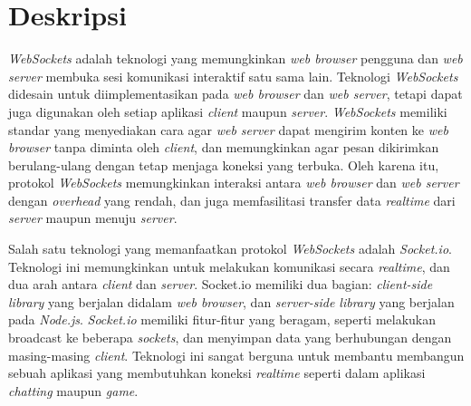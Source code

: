 \documentclass[a4paper,twoside]{article}
\begin{document}
\title{\@judultopik}
\author{\nama \textendash \@npm} 

\newcommand{\nama}{Priambodo Pangestu}
\newcommand{\@npm}{2013730055}
\newcommand{\@judultopik}{Pemanfaatan Smartphone Sebagai Pengendali Permainan Berbasis Web} %
\newcommand{\jumpemb}{1} %
\newcommand{\tanggal}{13/09/2017}
\maketitle


\section{Deskripsi} 
\textit{WebSockets} adalah teknologi yang memungkinkan \textit{web browser} pengguna dan \textit{web server} membuka sesi komunikasi interaktif satu sama lain. Teknologi \textit{WebSockets}  didesain untuk diimplementasikan pada \textit{web browser} dan \textit{web server}, tetapi dapat juga digunakan oleh setiap aplikasi \textit{client} maupun \textit{server}. \textit{WebSockets} memiliki standar yang menyediakan cara agar \textit{web server} dapat mengirim konten ke \textit{web browser} tanpa diminta oleh \textit{client}, dan memungkinkan agar pesan dikirimkan berulang-ulang dengan tetap menjaga koneksi yang terbuka. Oleh karena itu, protokol \textit{WebSockets} memungkinkan interaksi antara \textit{web browser} dan \textit{web server} dengan \textit{overhead} yang rendah, dan juga memfasilitasi transfer data \textit{realtime} dari \textit{server} maupun menuju \textit{server}.

Salah satu teknologi yang memanfaatkan protokol \textit{WebSockets} adalah \textit{Socket.io}. Teknologi ini memungkinkan untuk melakukan komunikasi secara \textit{realtime}, dan dua arah antara \textit{client} dan \textit{server}. Socket.io memiliki dua bagian: \textit{client-side library} yang berjalan didalam \textit{web browser}, dan \textit{server-side library} yang berjalan pada \textit{Node.js}. \textit{Socket.io} memiliki fitur-fitur yang beragam, seperti melakukan broadcast ke beberapa \textit{sockets}, dan menyimpan data yang berhubungan dengan masing-masing \textit{client}. Teknologi ini sangat berguna untuk membantu membangun sebuah aplikasi yang membutuhkan koneksi \textit{realtime} seperti dalam aplikasi \textit{chatting} maupun \textit{game}.
\end{document}
